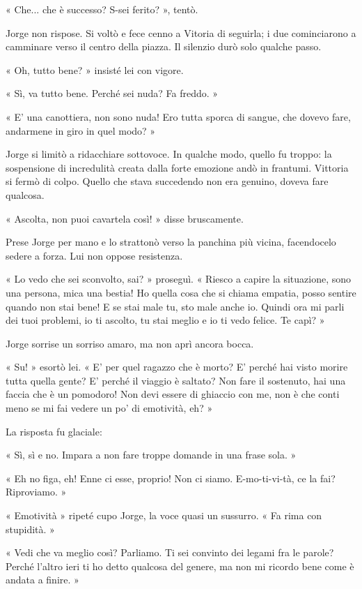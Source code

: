 « Che... che è successo? S-sei ferito? », tentò.

Jorge non rispose. Si voltò e fece cenno a Vitoria di seguirla; i due cominciarono a camminare verso il centro della piazza. Il silenzio durò solo qualche passo.

« Oh, tutto bene? » insisté lei con vigore.

« Sì, va tutto bene. Perché sei nuda? Fa freddo. »

« E' una canottiera, non sono nuda! Ero tutta sporca di sangue, che dovevo fare, andarmene in giro in quel modo? »

Jorge si limitò a ridacchiare sottovoce. In qualche modo, quello fu troppo: la sospensione di incredulità creata dalla forte emozione andò in frantumi. Vittoria si fermò di colpo. Quello che stava succedendo non era genuino, doveva fare qualcosa.

« Ascolta, non puoi cavartela così! » disse bruscamente.

Prese Jorge per mano e lo strattonò verso la panchina più vicina, facendocelo sedere a forza. Lui non oppose resistenza.

« Lo vedo che sei sconvolto, sai? » proseguì. « Riesco a capire la situazione, sono una persona, mica una bestia! Ho quella cosa che si chiama empatia, posso sentire quando non stai bene! E se stai male tu, sto male anche io. Quindi ora mi parli dei tuoi problemi, io ti ascolto, tu stai meglio e io ti vedo felice. Te capì? »

Jorge sorrise un sorriso amaro, ma non aprì ancora bocca.

« Su! » esortò lei. « E' per quel ragazzo che è morto? E' perché hai visto morire tutta quella gente? E' perché il viaggio è saltato? Non fare il sostenuto, hai una faccia che è un pomodoro! Non devi essere di ghiaccio con me, non è che conti meno se mi fai vedere un po' di emotività, eh? »

La risposta fu glaciale:

« Sì, sì e no. Impara a non fare troppe domande in una frase sola. »

« Eh no figa, eh! Enne ci esse, proprio! Non ci siamo. E-mo-ti-vi-tà, ce la fai? Riproviamo. »

« Emotività » ripeté cupo Jorge, la voce quasi un sussurro. « Fa rima con stupidità. »

« Vedi che va meglio così? Parliamo. Ti sei convinto dei legami fra le parole? Perché l'altro ieri ti ho detto qualcosa del genere, ma non mi ricordo bene come è andata a finire. »

